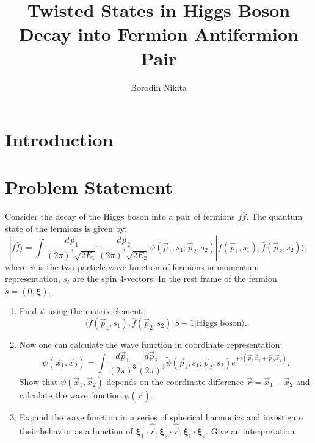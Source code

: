 \documentclass[12pt]{article}
\begin{document}
	\title{Twisted States in Higgs Boson Decay into Fermion Antifermion Pair}
	
	\author{Borodin Nikita}
	
	
	
	\maketitle
	\newpage
	\section{Introduction}
	
	\section*{\textbf{Problem Statement}}
	
	Consider the decay of the Higgs boson into a pair of fermions \( f \bar{f} \).
	The quantum state of the fermions is given by:
	\[
	|f \bar{f}\rangle = \int \frac{d\vec{p}_1}{(2\pi)^3 \sqrt{2E_1}} \frac{d\vec{p}_2}{(2\pi)^3 \sqrt{2E_2}} \psi(\vec{p}_1, s_1; \vec{p}_2, s_2) |f(\vec{p}_1, s_1), \bar{f}(\vec{p}_2, s_2)\rangle,
	\]
	where \( \psi \) is the two-particle wave function of fermions in momentum representation, \( s_i \) are the spin 4-vectors. In the rest frame of the fermion \( s = (0, \boldsymbol{\xi}) \).
	
	\begin{enumerate}
		\item Find \( \psi \) using the matrix element:
		\[
		\langle f(\vec{p}_1, s_1), \bar{f}(\vec{p}_2, s_2) | S - 1 | \text{Higgs boson} \rangle.
		\]
		
		\item Now one can calculate the wave function in coordinate representation:
		\[
		\psi(\vec{x}_1, \vec{x}_2) = \int \frac{d\vec{p}_1}{(2\pi)^3} \frac{d\vec{p}_2}{(2\pi)^3} \widetilde{\psi}(\vec{p}_1, s_1; \vec{p}_2, s_2) e^{+i(\vec{p}_1 \vec{x}_1 + \vec{p}_2 \vec{x}_2)}.
		\]
		Show that \( \psi(\vec{x}_1, \vec{x}_2) \) depends on the coordinate difference \( \vec{r} = \vec{x}_1 - \vec{x}_2 \) and calculate the wave function \( \psi(\vec{r}) \).
		
		\item Expand the wave function in a series of spherical harmonics and investigate their behavior as a function of \( \boldsymbol{\xi}_1 \cdot \hat{\vec{r}}, \boldsymbol{\xi}_2 \cdot \hat{\vec{r}}, \boldsymbol{\xi}_1 \cdot \boldsymbol{\xi}_2 \). Give an interpretation.
	\end{enumerate}
	
\end{document}
